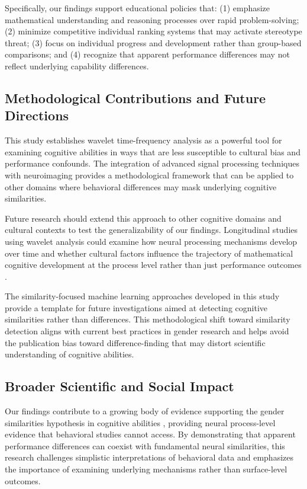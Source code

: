\documentclass[pdflatex,sn-nature]{sn-jnl}%
\theoremstyle{thmstyleone}%
\theoremstyle{thmstyletwo}%
\theoremstyle{thmstylethree}%
\begin{document}
Specifically, our findings support educational policies that: (1) emphasize mathematical understanding and reasoning processes over rapid problem-solving; (2) minimize competitive individual ranking systems that may activate stereotype threat; (3) focus on individual progress and development rather than group-based comparisons; and (4) recognize that apparent performance differences may not reflect underlying capability differences.


\subsection{Methodological Contributions and Future Directions}
This study establishes wavelet time-frequency analysis as a powerful tool for examining cognitive abilities in ways that are less susceptible to cultural bias and performance confounds. The integration of advanced signal processing techniques with neuroimaging provides a methodological framework that can be applied to other domains where behavioral differences may mask underlying cognitive similarities.

Future research should extend this approach to other cognitive domains and cultural contexts to test the generalizability of our findings. Longitudinal studies using wavelet analysis could examine how neural processing mechanisms develop over time and whether cultural factors influence the trajectory of mathematical cognitive development at the process level rather than just performance outcomes \cite{grabner2013individual}.

The similarity-focused machine learning approaches developed in this study provide a template for future investigations aimed at detecting cognitive similarities rather than differences. This methodological shift toward similarity detection aligns with current best practices in gender research and helps avoid the publication bias toward difference-finding that may distort scientific understanding of cognitive abilities.


\subsection{Broader Scientific and Social Impact}
Our findings contribute to a growing body of evidence supporting the gender similarities hypothesis in cognitive abilities \cite{hyde2005gender,lindberg2010new}, providing neural process-level evidence that behavioral studies cannot access. By demonstrating that apparent performance differences can coexist with fundamental neural similarities, this research challenges simplistic interpretations of behavioral data and emphasizes the importance of examining underlying mechanisms rather than surface-level outcomes.
\end{document}
